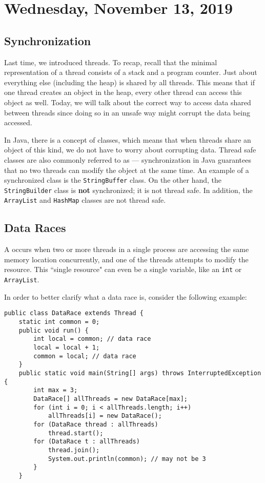 \section{Wednesday, November 13, 2019}
\subsection{Synchronization}
Last time, we introduced threads. To recap, recall that the minimal representation of a thread consists of a stack and a program counter. Just about everything else (including the heap) is shared by all threads. This means that if one thread creates an object in the heap, every other thread can access this object as well. Today, we will talk about the correct way to access data shared between threads since doing so in an unsafe way might corrupt the data being accessed.

In Java, there is a concept of  classes, which means that when threads share an object of this kind, we do not have to worry about corrupting data. Thread safe classes are also commonly referred to as  --- synchronization in Java guarantees that no two threads can modify the object at the same time. An example of a synchronized class is the \verb!StringBuffer! class. On the other hand, the \verb!StringBuilder! class is \textbf{not} synchronized; it is not thread safe. In addition, the \verb!ArrayList! and \verb!HashMap! classes are not thread safe.


\subsection{Data Races}

A  occurs when two or more threads in a single process are accessing the same memory location concurrently, and one of the threads attempts to modify the resource. This ``single resource" can even be a single variable, like an \verb!int! or \verb!ArrayList!. 

In order to better clarify what a data race is, consider the following example:

\begin{lstlisting}
public class DataRace extends Thread {
    static int common = 0;
    public void run() {
        int local = common; // data race
        local = local + 1;
        common = local; // data race
    }
    public static void main(String[] args) throws InterruptedException {
        int max = 3;
        DataRace[] allThreads = new DataRace[max];
        for (int i = 0; i < allThreads.length; i++)
            allThreads[i] = new DataRace();
        for (DataRace thread : allThreads)
            thread.start();
        for (DataRace t : allThreads)
            thread.join();
            System.out.println(common); // may not be 3
        }
    }
\end{lstlisting}

